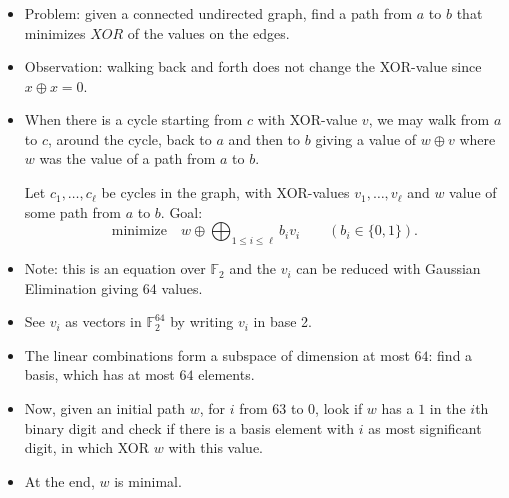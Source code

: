 
\begin{frame}
	\frametitle{\problemtitle}
    \begin{itemize}
		\item Problem: given a connected undirected graph, find a path from $a$ to $b$ that minimizes $XOR$ of the values on the edges.
		\pause
		\item Observation: walking back and forth does not change the XOR-value since $x \oplus x = 0$.
		\item
			When there is a cycle starting from $c$ with XOR-value $v$, we may walk from $a$ to $c$, around the cycle, back to $a$ and then to $b$ giving a value of $w \oplus v$ where $w$ was the value of a path from $a$ to $b$.

			Let $c_1, \dots, c_{\ell}$ be cycles in the graph, with XOR-values $v_1, \dots, v_{\ell}$ and $w$ value of some path from $a$ to $b$.
			Goal:
			\[
				\text{minimize} \quad w \oplus \bigoplus_{1 \leq i \leq \ell} b_i v_i \qquad (b_i \in \{0,1\}).
			\]
		\pause
		\item
			Note: this is an equation over $\mathbb{F}_2$ and the $v_i$ can be reduced with Gaussian Elimination giving $64$ values.
		\item
			See $v_i$ as vectors in $\mathbb{F}_2^{64}$ by writing $v_i$ in base 2.
		\item
			The linear combinations form a subspace of dimension at most $64$: find a basis, which has at most $64$ elements.
		\item
			Now, given an initial path $w$, for $i$ from 63 to $0$, look if $w$ has a $1$ in the $i$th binary digit and check if there is a basis element with $i$ as most significant digit, in which XOR $w$ with this value.
		\item
			At the end, $w$ is minimal.
    \end{itemize}
\end{frame}
